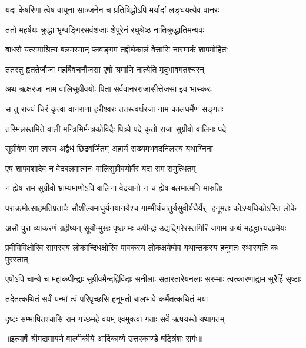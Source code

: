 \twolineshloka
{यदा केषरिणा त्वेष वायुना साञ्जनेन च}
{प्रतिषिद्धोऽपि मर्यादां लङ्घयत्येव वानरः} %

\twolineshloka
{ततो महर्षयः क्रुद्धा भृग्वङ्गिरसवंशजाः}
{शेपुरेनं रघुश्रेष्ठ नातिक्रुद्धातिमन्यवः} %

\twolineshloka
{बाधसे यत्समाश्रित्य बलमस्मान् प्लवङ्गम}
{तद्दीर्घकालं वेत्तासि नास्माकं शापमोहितः} %

\twolineshloka
{ततस्तु हृततेजौजा महर्षिवचनौजसा}
{एषो श्रमाणि नात्येति मृदुभावगतश्चरन्} %

\twolineshloka
{अथ ऋक्षरजा नाम वालिसुग्रीवयोः पिता}
{सर्ववानरराजासीत्तेजसा इव भास्करः} %

\twolineshloka
{स तु राज्यं चिरं कृत्वा वानराणां हरीश्वरः}
{ततस्त्वर्क्षरजा नाम कालधर्मेण सङ्गतः} %

\twolineshloka
{तस्मिन्नस्तमिते वाली मन्त्रिभिर्मन्त्रकोविदैः}
{पित्र्ये पदे कृतो राजा सुग्रीवो वालिनः पदे} %

\twolineshloka
{सुग्रीवेण समं त्वस्य अद्वैधं छिद्रवर्जितम्}
{अहार्यं सख्यमभवदनिलस्य यथाग्निना} %

\twolineshloka
{एष शापवशादेव न वेदबलमात्मनः}
{वालिसुग्रीवयोर्वैरं यदा राम समुत्थितम्} %

\twolineshloka
{न ह्येष राम सुग्रीवो भ्राम्यमाणोऽपि वालिना}
{वेदयानो न च ह्येष बलमात्मनि मारुतिः} %

\fourlineindentedshloka
{पराक्रमोत्साहमतिप्रतापैः}
{सौशील्यमाधुर्यनयानयैश्च}
{गाम्भीर्यचातुर्यसुवीर्यधैर्यैर्-}
{हनूमतः कोऽप्यधिकोऽस्ति लोके} %

\fourlineindentedshloka
{असौ पुरा व्याकरणं ग्रहीष्यन्}
{सूर्योन्मुखः पृष्ठगमः कपीन्द्रः}
{उद्यद्गिरेरस्तगिरिं जगाम}
{ग्रन्थं महद्धारयदप्रमेयः} %

\fourlineindentedshloka
{प्रवीविविक्षोरिव सागरस्य}
{लोकान्दिधक्षोरिव पावकस्य}
{लोकक्षयेष्वेव यथान्तकस्य}
{हनूमतः स्थास्यति कः पुरस्तात्} %

\fourlineindentedshloka
{एषोऽपि चान्ये च महाकपीन्द्राः}
{सुग्रीवमैन्दद्विविदाः सनीलाः}
{सतारतारेयनलाः सरम्भाः}
{त्वत्कारणाद्राम सुरैर्हि सृष्टाः} %

\twolineshloka
{तदेतत्कथितं सर्वं यन्मां त्वं परिपृच्छसि}
{हनूमतो बालभावे कर्मैतत्कथितं मया} %

\twolineshloka
{दृष्टः सम्भाषितश्चासि राम गच्छमहे वयम्}
{एवमुक्त्वा गताः सर्वे ऋषयस्ते यथागतम्} %


{॥इत्यार्षे श्रीमद्रामायणे वाल्मीकीये आदिकाव्ये उत्तरकाण्डे षट्त्रिंशः सर्गः॥}

